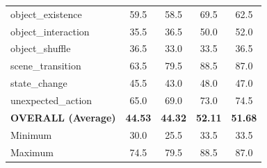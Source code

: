 \documentclass[conference]{IEEEtran}
\begin{document}
\begin{table}[!t]
\begin{tabular}{lcccc}
    object\_existence          & 59.5 & 58.5 & 69.5 & 62.5  \\
    object\_interaction        & 35.5 & 36.5 & 50.0 & 52.0  \\
    object\_shuffle            & 36.5 & 33.0 & 33.5 & 36.5  \\
    scene\_transition          & 63.5 & 79.5 & 88.5 & 87.0  \\
    state\_change              & 45.5 & 43.0 & 48.0 & 47.0  \\
    unexpected\_action         & 65.0 & 69.0 & 73.0 & 74.5  \\
    \midrule
    \textbf{OVERALL (Average)} & \textbf{44.53} & \textbf{44.32}
                               & \textbf{52.11} & \textbf{51.68} \\
    Minimum                    & 30.0 & 25.5 & 33.5 & 33.5  \\
    Maximum                    & 74.5 & 79.5 & 88.5 & 87.0  \\
    \bottomrule
  \end{tabular}
\end{table}
\end{document}
